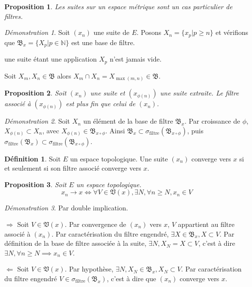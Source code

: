 \documentclass[a4paper, 11pt, french]{book}
\newenvironment{itemise}{\itemize}{\enditemize}
\theoremstyle{plain} %
\newtheorem{proposition}{Proposition}
\theoremstyle{definition} %
\newtheorem{definition}{Définition}
\theoremstyle{remark} %
\newtheorem*{demonstration}{Démonstration}
\newcommand{\1}{\mathds{1}}
\newcommand{\supegal}{\geqslant}
\newcommand{\N}{\mathbb{N}}
\begin{document}
\begin{proposition}
	Les suites sur un espace métrique sont un cas particulier de filtres.
\end{proposition}

\begin{demonstration}
	Soit $(x_n)$ une suite de $E$.
	Posons $X_n=\{x_p | p\supegal n\}$ et vérifions que $\mathfrak{B}_x=\{X_p | p\in\N\}$ est une base de filtre.
	\begin{itemise}
		\item une suite étant une application $X_p$ n'est jamais vide.
		\item Soit $X_m, X_n\in\mathfrak{B}$ alors $X_m\cap X_n=X_{\max(m, n)}\in\mathfrak{B}$.
	\end{itemise}
\end{demonstration}

\begin{proposition}
	Soit $(x_n)$ une suite et $(x_{\phi(n)})$ une suite extraite.
	Le filtre associé à $(x_{\phi(n)})$ est plus fin que celui de $(x_n)$.
\end{proposition}

\begin{demonstration}
	Soit $X_n$ un élément de la base de filtre $\mathfrak{B}_x$.
	Par croissance de $\phi$, $X_{\phi(n)}\subset X_n$, avec $X_{\phi(n)}\in\mathfrak{B}_{x\circ\phi}$.
	Ainsi $\mathfrak{B}_x\subset\sigma_\text{filtre}(\mathfrak{B}_{x\circ\phi})$, puis $\sigma_\text{filtre}(\mathfrak{B}_x)\subset\sigma_\text{filtre}(\mathfrak{B}_{x\circ\phi})$.
\end{demonstration}

\begin{definition}
	Soit $E$ un espace topologique.
	Une suite $(x_n)$ converge vers $x$ si et seulement si son filtre associé converge vers $x$.
\end{definition}

\begin{proposition}
	Soit $E$ un espace topologique.
	$$
		x_n\rightarrow x
		\iff
		\forall V\in\mathfrak{V}(x), \exists N, \forall n\supegal N, x_n\in V
	$$
\end{proposition}

\begin{demonstration}
	Par double implication.
	\begin{itemise}
		\item[$\Rightarrow$] Soit $V\in\mathfrak{V}(x)$.
		Par convergence de $(x_n)$ vers $x$, $V$ appartient au filtre associé à $(x_n)$.
		Par caractérisation du filtre engendré, $\exists X\in\mathfrak{B}_x, X\subset V$.
		Par définition de la base de filtre associée à la suite, $\exists N, X_N=X\subset V$, c'est à dire $\exists N, \forall n\supegal N\implies x_n\in V$.
		\item[$\Leftarrow$] Soit $V\in\mathfrak{V}(x)$.
		Par hypothèse, $\exists N, X_N\in\mathfrak{B}_x, X_N\subset V$.
		Par caractérisation du filtre engendré $V\in\sigma_\text{filtre}(\mathfrak{B}_x)$, c'est à dire que $(x_n)$ converge vers $x$.
	\end{itemise}
\end{demonstration}
\end{document}
